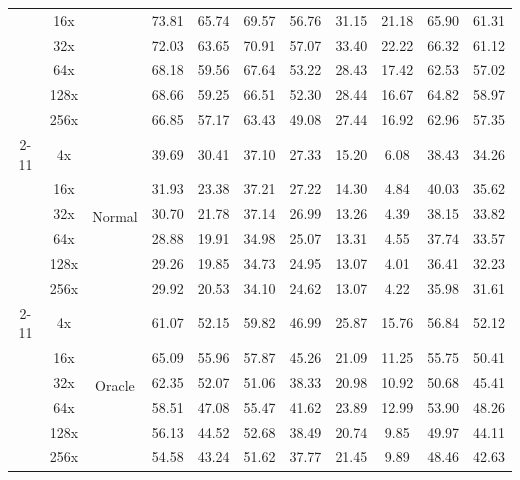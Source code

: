 \documentclass{applemlr}
\numberwithin{equation}{section}
\begin{document}
\begin{table}[!htbp]
\begin{tabular}{c|c|c|cc|cc|cc|cc}
 & 16x &  & 73.81 & 65.74 & 69.57 & 56.76 & 31.15 & 21.18 & 65.90 & 61.31\\

 & 32x &  & 72.03 & 63.65 & 70.91 & 57.07 & 33.40 & 22.22 & 66.32 & 61.12 \\

 & 64x &  & 68.18 & 59.56 & 67.64 & 53.22 & 28.43 & 17.42 & 62.53 & 57.02\\

 & 128x &  & 68.66 & 59.25 & 66.51 & 52.30 & 28.44 & 16.67 & 64.82 & 58.97 \\

 & 256x  &  & 66.85 & 57.17 & 63.43 & 49.08 & 27.44 & 16.92 & 62.96 & 57.35  \\
\cline{2-11}
 \multirow{12}{*}{CLaRa-Phi4-mini} & 4x & \multirow{6}{*}{Normal} & 39.69 & 30.41 & 37.10 & 27.33 & 15.20 & 6.08 & 38.43 & 34.26  \\
 & 16x &  & 31.93 & 23.38 & 37.21 & 27.22 & 14.30 & 4.84 & 40.03 & 35.62  \\
 & 32x &  & 30.70 & 21.78 & 37.14 & 26.99 & 13.26 & 4.39 & 38.15 & 33.82 \\
 & 64x &  & 28.88 & 19.91 & 34.98 & 25.07 & 13.31 & 4.55 & 37.74 & 33.57 \\
& 128x &  & 29.26 & 19.85 & 34.73 & 24.95 & 13.07 & 4.01 & 36.41 & 32.23 \\
 & 256x &  & 29.92 & 20.53 & 34.10 & 24.62 & 13.07 & 4.22 & 35.98 & 31.61 \\
\cline{2-11}

 & 4x & \multirow{6}{*}{Oracle}  & 61.07 & 52.15 & 59.82 & 46.99 & 25.87 & 15.76 & 56.84 & 52.12 \\

 &16x  &  & 65.09 & 55.96 & 57.87 & 45.26 & 21.09 & 11.25 & 55.75 & 50.41  \\

 & 32x &  & 62.35 & 52.07 & 51.06 & 38.33 & 20.98 & 10.92 & 50.68 & 45.41  \\

 & 64x &  & 58.51 & 47.08 & 55.47 & 41.62 & 23.89 & 12.99 & 53.90 & 48.26 \\

 &  128x&  & 56.13 & 44.52 & 52.68 & 38.49 & 20.74 & 9.85 & 49.97 & 44.11  \\

 & 256x &  & 54.58 & 43.24 & 51.62 & 37.77 & 21.45 & 9.89 & 48.46 & 42.63\\


\end{tabular}
\end{table}
\end{document}

